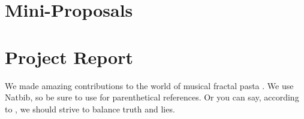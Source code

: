 \documentclass[12pt]{article}
\begin{document}
  \section{Mini-Proposals}

  \section{Project Report} 
    We made amazing contributions to the world of musical fractal pasta 
    \citep{McDonald2017,Tibshirani2013}. We use Natbib, so be sure to use
    \citep{Stein1981} for parenthetical references. Or you can say, according to
    \citet{HastieTibshirani2009}, we should strive to balance truth and lies.




\end{document}
